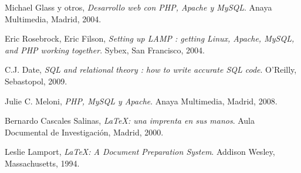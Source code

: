 \begin{thebibliography}{50}

  Michael Glass y otros,
  \emph{Desarrollo web con PHP, Apache y MySQL}.
  Anaya Multimedia, Madrid,
  2004.

   Eric Rosebrock, Eric Filson,
  \emph{Setting up LAMP : getting Linux, Apache, MySQL, and PHP working
together}.
  Sybex, San Francisco,
  2004.

   C.J. Date,
  \emph{SQL and relational theory : how to write accurate SQL code}.
  O'Reilly, Sebastopol,
  2009.

   Julie C. Meloni,
  \emph{PHP, MySQL y Apache}.
  Anaya Multimedia, Madrid,
  2008.

  Bernardo Cascales Salinas,
  \emph{\LaTeX: una imprenta en sus manos}.
  Aula Documental de Investigación, Madrid,
  2000.

  Leslie Lamport,
  \emph{\LaTeX: A Document Preparation System}.
  Addison Wesley, Massachusetts,
  1994.

\end{thebibliography}